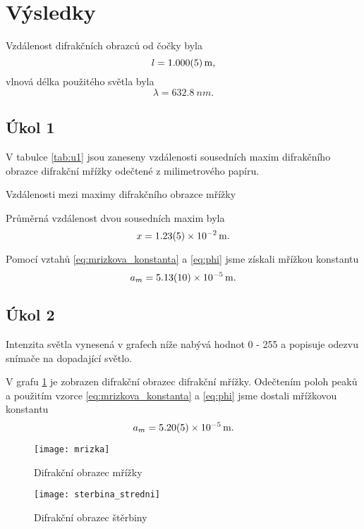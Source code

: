 \documentclass{protokol}
\begin{document}
  \section*{Výsledky}

    Vzdálenost difrakčních obrazců od čočky byla 
    $$ l = \SI{1.000 \pm 0.005}{m}, $$
    vlnová délka použitého světla byla 
    $$ \lambda = \SI{632.8}{nm}. $$

    \subsection*{Úkol 1}

      V tabulce \ref{tab:u1} jsou zaneseny vzdálenosti sousedních maxim difrakčního obrazce difrakční mřížky odečtené z milimetrového papíru.

      \begin{table}[H]
        \centering
        \setlength{\tabcolsep}{2.6pt}
        
        \caption{Vzdálenosti mezi maximy difrakčního obrazce mřížky}
        \label{tab:u1}
      \end{table}

      Průměrná vzdálenost dvou sousedních maxim byla 
      $$ x = \SI{1.23 \pm 0.05 e-2}{m}. $$

      Pomocí vztahů \eqref{eq:mrizkova_konstanta} a \eqref{eq:phi} jsme získali mřížkou konstantu
      $$ a_m = \SI{5.13 \pm 0.10 e-5}{m}. $$

    \subsection*{Úkol 2}

      Intenzita světla vynesená v grafech níže nabývá hodnot 0 - 255 a popisuje odezvu snímače na dopadající světlo.

      V grafu \ref{fig:mrizka} je zobrazen difrakční obrazec difrakční mřížky. Odečtením poloh peaků a použitím vzorce \eqref{eq:mrizkova_konstanta} a \eqref{eq:phi} jsme dostali mřížkovou konstantu 
      $$ a_m = \SI{5.20 \pm 0.05 e-5}{m}. $$

      \begin{figure}[H]
        \centering
        \texttt{[image: mrizka]} 
        \caption{Difrakční obrazec mřížky}
        \label{fig:mrizka}
      \end{figure}

      \begin{figure}[H]
        \centering
        \texttt{[image: sterbina\_stredni]}
        \caption{Difrakční obrazec štěrbiny}
        \label{fig:sterbina_stredni}
      \end{figure}
\end{document}
